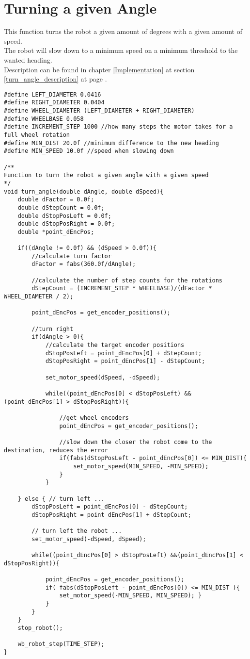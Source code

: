 \section{Turning a given Angle}
\label{turning_amgle_code}
This function turns the robot a given amount of degrees with a given amount of speed.\\
The robot will slow down to a minimum speed on a minimum threshold to the wanted heading.\\
Description can be found in chapter \ref{Implementation} at section \ref{turn_angle_description} at page \pageref{turn_angle_description}. 

\begin{lstlisting}[caption = {Turning an angle}]
#define LEFT_DIAMETER 0.0416
#define RIGHT_DIAMETER 0.0404
#define WHEEL_DIAMETER (LEFT_DIAMETER + RIGHT_DIAMETER)
#define WHEELBASE 0.058 
#define INCREMENT_STEP 1000 //how many steps the motor takes for a full wheel rotation
#define MIN_DIST 20.0f //minimum difference to the new heading
#define MIN_SPEED 10.0f //speed when slowing down

/**
Function to turn the robot a given angle with a given speed
*/
void turn_angle(double dAngle, double dSpeed){
	double dFactor = 0.0f;
	double dStepCount = 0.0f;
	double dStopPosLeft = 0.0f;
	double dStopPosRight = 0.0f;
	double *point_dEncPos;
	
	if((dAngle != 0.0f) && (dSpeed > 0.0f)){
		//calculate turn factor
		dFactor = fabs(360.0f/dAngle);
		
		//calculate the number of step counts for the rotations
		dStepCount = (INCREMENT_STEP * WHEELBASE)/(dFactor * WHEEL_DIAMETER / 2);
		
		point_dEncPos = get_encoder_positions();
		
		//turn right
		if(dAngle > 0){
			//calculate the target encoder positions
			dStopPosLeft = point_dEncPos[0] + dStepCount;
			dStopPosRight = point_dEncPos[1] - dStepCount;
			
			set_motor_speed(dSpeed, -dSpeed);
			
			while((point_dEncPos[0] < dStopPosLeft) && (point_dEncPos[1] > dStopPosRight)){
				
				//get wheel encoders
				point_dEncPos = get_encoder_positions();
				
				//slow down the closer the robot come to the destination, reduces the error
				if(fabs(dStopPosLeft - point_dEncPos[0]) <= MIN_DIST){
					set_motor_speed(MIN_SPEED, -MIN_SPEED);
				}
			}	
		
	} else { // turn left ...
		dStopPosLeft = point_dEncPos[0] - dStepCount;
		dStopPosRight = point_dEncPos[1] + dStepCount;

		// turn left the robot ...
		set_motor_speed(-dSpeed, dSpeed);

		while((point_dEncPos[0] > dStopPosLeft) &&(point_dEncPos[1] < dStopPosRight)){

			point_dEncPos = get_encoder_positions();
			if( fabs(dStopPosLeft - point_dEncPos[0]) <= MIN_DIST ){
				set_motor_speed(-MIN_SPEED, MIN_SPEED); }
			}
		}
	}
	stop_robot();

	wb_robot_step(TIME_STEP);
}

\end{lstlisting}

